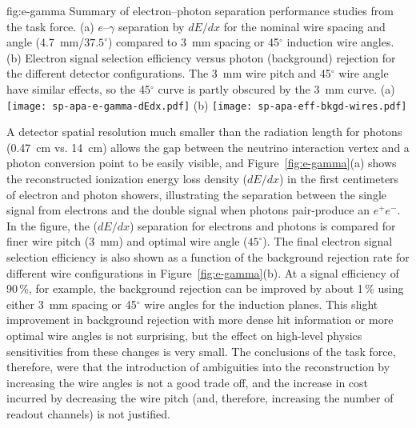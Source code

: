 \begin{itemize}
\begin{dunefigure}{fig:e-gamma}
{Summary of electron--photon separation performance studies from the   task force. (a) $e$--$\gamma$ separation by $dE/dx$ for the nominal wire spacing and angle (\SI{4.7}{mm}/$37.5^\circ$) compared to \SI{3}{mm} spacing or 45$^\circ$ induction wire angles. (b) Electron signal selection efficiency versus photon (background) rejection for the different detector configurations. The \SI{3}{mm} wire pitch and 45$^\circ$ wire angle have similar effects, so the 45$^\circ$ curve is partly obscured by the \SI{3}{mm} curve.}
(a)
\texttt{[image: sp-apa-e-gamma-dEdx.pdf]} \qquad
(b)
\texttt{[image: sp-apa-eff-bkgd-wires.pdf]} 
\end{dunefigure}

A detector spatial resolution much smaller than the radiation length for photons (\SI{0.47}{cm} vs. \SI{14}{cm}) allows the gap between the neutrino interaction vertex and a photon conversion point to be easily visible, and  Figure~\ref{fig:e-gamma}(a) shows the reconstructed ionization energy loss density ($dE/dx$) in the first centimeters of electron and photon showers, illustrating the separation between the single  signal from electrons and the double  signal when photons pair-produce an $e^+e^-$.  In the figure, the ($dE/dx$) separation for electrons and photons is compared for finer wire pitch (\SI{3}{mm}) and optimal wire angle ($45^\circ$). The final electron signal selection efficiency is also shown as a function of the background rejection rate for different wire configurations in Figure~\ref{fig:e-gamma}(b). At a signal efficiency of \num{90}\,\%, for example, the background rejection can be improved by about \num{1}\,\% using either \SI{3}{mm} spacing or 45$^\circ$ wire angles for the induction planes.  This slight improvement in background rejection with more dense hit information or more optimal wire angles is not surprising, but the effect on high-level physics sensitivities from these changes is very small. The conclusions of the  task force, therefore, were that the introduction of ambiguities into the reconstruction by increasing the wire angles is not a good trade off, and the increase in cost incurred by decreasing the wire pitch (and, therefore, increasing the number of readout channels) is not justified.  




\end{itemize}
